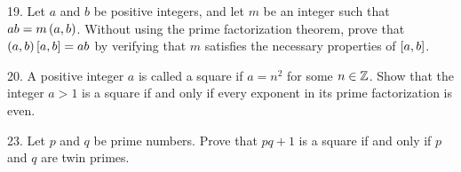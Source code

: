 \begin{mdframed}[style=darkAnswer,frametitle={Joe Starr}]
    
\end{mdframed}
\newpage
\begin{mdframed}[style=darkQuesion]
19. Let $a$ and $b$ be positive integers, and let $m$ be an integer such that 
$ab=m\left(a,b\right)$. Without using the prime factorization theorem, prove that 
$\left(a,b\right)\left[a,b\right]=ab$ by verifying that $m$ satisfies the necessary properties
of $\left[a,b\right]$.
\end{mdframed}

\begin{mdframed}[style=darkAnswer,frametitle={Joe Starr}]
    
\end{mdframed}
\newpage
\begin{mdframed}[style=darkQuesion]
20. A positive integer $a$ is called a square if $a=n^2$ for some $n\in \mathbb{Z}$. 
Show that the integer $a>1$ is a square if and only if every exponent in its 
prime factorization is even. 
\end{mdframed}

\begin{mdframed}[style=darkAnswer,frametitle={Joe Starr}]
    
\end{mdframed}
\newpage
\begin{mdframed}[style=darkQuesion]
23. Let $p$ and $q$ be prime numbers. Prove that $pq+1$ is a square if and only 
if $p$ and $q$ are twin primes.
\end{mdframed}

